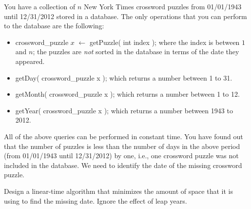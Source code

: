 \documentclass{article}
\begin{document}
 You have a collection of $n$ New York Times
crossword puzzles from 01/01/1943 until 12/31/2012 stored in a
database. The only operations that you can perform to the database are
the following:
\begin{itemize}
\item crossword\_puzzle $x$ $\leftarrow$ getPuzzle( int index ); where the
  index is between $1$ and $n$; the puzzles are \emph{not} sorted in the
  database in terms of the date they appeared.
\item getDay( crossword\_puzzle x ); which returns a number between 1
  to 31.
\item getMonth( crossword\_puzzle x ); which returns a number between
  1 to 12.
\item getYear( crossword\_puzzle x ); which returns a number between
  1943 to 2012.
\end{itemize}
All of the above queries can be performed in constant time. You have
found out that the number of puzzles is less than the number of days
in the above period (from 01/01/1943 until 12/31/2012) by one, i.e.,
one crossword puzzle was not included in the database. We need to
identify the date of the missing crossword puzzle.

Design a linear-time algorithm that minimizes the amount of space that
it is using to find the missing date. Ignore the effect of leap years.\\
\end{document}
